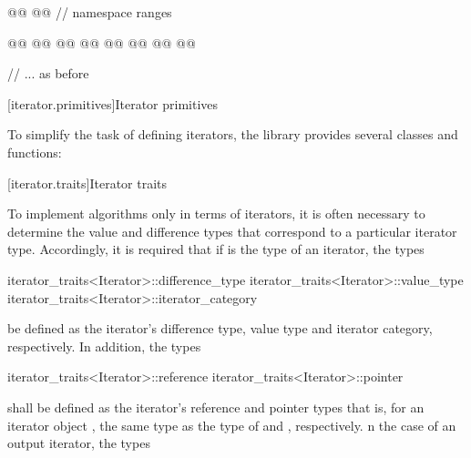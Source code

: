 \begin{codeblock}
{{    @@
      @@
  } // namespace ranges

  @@
  @@
    @@
  @@
    @@
  @@
      @@
    @@
  
  // ... as before
}
\end{codeblock}


[iterator.primitives]{Iterator primitives}

\pnum
To simplify the task of defining iterators, the library provides
several classes and functions:

[iterator.traits]{Iterator traits}


\pnum
{}%
To implement algorithms only in terms of iterators, it is often necessary to
determine the value and
difference types that correspond to a particular iterator type.
Accordingly, it is required that if
is the type of an iterator,
the types

%
%
%
\begin{codeblock}
iterator_traits<Iterator>::difference_type
iterator_traits<Iterator>::value_type
iterator_traits<Iterator>::iterator_category
\end{codeblock}

be defined as the iterator's difference type, value type and iterator category, respectively.
In addition, the types

%
%
\begin{codeblock}
iterator_traits<Iterator>::reference
iterator_traits<Iterator>::pointer
\end{codeblock}

shall be defined as the iterator's reference and pointer types\changed{,}{;} that is, for an
iterator object , the same type as the type of  and ,
respectively. n the case of an output
iterator, the types


